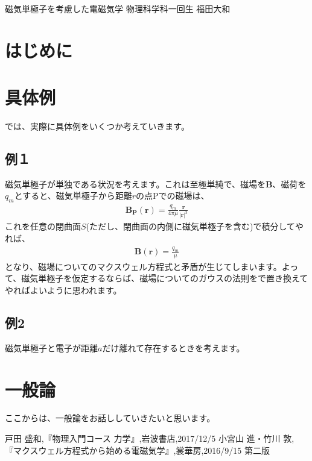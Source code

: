 \documentclass[10pt,b5paper,papersize,dvipdfmx]{jsbook}
\begin{document}

\kaishititle%
  {磁気単極子を考慮した電磁気学}%
  {物理科学科一回生}%
  {福田大和}%


%
\section*{はじめに}


\section{具体例}
では、実際に具体例をいくつか考えていきます。
\subsection{例１}
磁気単極子が単独である状況を考えます。これは至極単純で、磁場を$\mathbf{B}$、磁荷を$q_m$とすると、磁気単極子から距離$r$の点Pでの磁場は、
\begin{align}
\mathbf{B_P}(\mathbf{r})=\frac{q_m}{4\pi\mu}\frac{\mathbf{r}}{|\mathbf{r}|^3}
\end{align}
これを任意の閉曲面$S$(ただし、閉曲面の内側に磁気単極子を含む)で積分してやれば、
\begin{align}
\label{eq:Gaussjm}
\mathbf{B}(\mathbf{r})=\frac{q_m}{\mu}
\end{align}
となり、磁場についてのマクスウェル方程式と矛盾が生じてしまいます。よって、磁気単極子を仮定するならば、磁場についてのガウスの法則をで置き換えてやればよいように思われます。
\subsection{例2}
磁気単極子と電子が距離$a$だけ離れて存在するときを考えます。

\section{一般論}
ここからは、一般論をお話ししていきたいと思います。


\begin{thebibliography}{9}
 戸田 盛和,『物理入門コース 力学』,岩波書店,2017/12/5
 小宮山 進・竹川 敦,『マクスウェル方程式から始める電磁気学』,裳華房,2016/9/15 第二版

\end{thebibliography}
\end{document}
